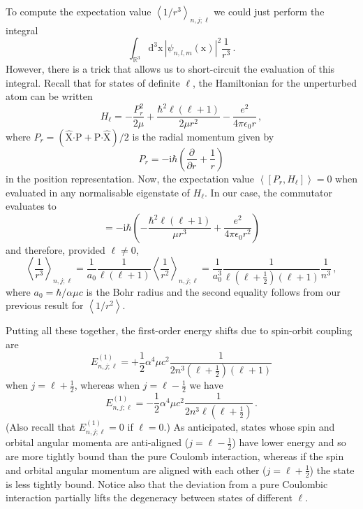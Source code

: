 \documentclass{article}
\theoremstyle{plain}\theoremheaderfont{\normalfont\itshape}\theorembodyfont{\rmfamily}\theoremseparator{.}\newtheorem*{rem}{Remark}\newtheorem*{ex}{Example}\newtheorem*{proof}{Proof}\newtheorem*{altp}{Alternative proof}
\theoremstyle{plain}\theoremheaderfont{\normalfont\bfseries}\theorembodyfont{\rmfamily}\theoremseparator{.}\newtheorem{thm}{Theorem}[section]\newtheorem{lem}[thm]{Lemma}\newtheorem{prop}[thm]{Proposition}\newtheorem*{cor}{Corollary}\newtheorem{defn}[thm]{Definition}\newtheorem{clm}[thm]{Claim}\newtheorem{clminproof}{Claim}
\theoremstyle{break}\theoremheaderfont{\normalfont\itshape}\theorembodyfont{\rmfamily}\theoremseparator{.\medskip}\newtheorem*{proofskip}{Proof}\newtheorem*{exs}{Examples}\newtheorem*{rems}{Remarks}
\theoremstyle{break}\theoremheaderfont{\normalfont\bfseries}\theorembodyfont{\rmfamily}\theoremseparator{.\medskip}\newtheorem{lemskip}[thm]{Lemma}\newtheorem{defnskip}[thm]{Definition}\newtheorem{propskip}[thm]{Proposition}\newtheorem{thmskip}[thm]{Theorem}
\numberwithin{equation}{section}
\newcommand{\ii}{\mathrm{i}}
\newcommand{\dd}[2][]{\mathrm{d}^{#1} #2\,}
\newcommand{\pdv}[3][]{\frac{\partial^{#1} #2}{{\partial #3}^{#1}}}
\newcommand{\eval}[1]{\left\langle #1 \right\rangle}
\newcommand{\vb}[1]{\bm{\mathrm{#1}}}
\newcommand{\vu}[1]{\hat{\bm{\mathrm{#1}}}}
\newcommand{\vdot}{\bm{\cdot}}
\newcommand{\abs}[1]{\left| #1 \right|}
\newcommand{\RR}{\mathbb{R}}
\begin{document}
    To compute the expectation value \(\eval{1/r^3}_{n,j;\ell}\) we could just perform the integral
    \begin{equation}
        \int_{\RR^3}\dd[3]{\vb{x}}\abs{\psi_{n,l,m}(\vb{x})}^2\frac{1}{r^3}\,.
    \end{equation}
    However, there is a trick that allows us to short-circuit the evaluation of this integral. Recall that for states of definite \(\ell\), the Hamiltonian for the unperturbed atom can be written
    \begin{equation}
        H_{\ell}=-\frac{P_r^2}{2\mu}+\frac{\hbar^2\ell(\ell+1)}{2\mu r^2}-\frac{e^2}{4\pi\epsilon_0 r}\,,
    \end{equation}
    where \(P_r=(\vu{X}\vdot\vb{P}+\vb{P}\vdot\vu{X})/2\) is the radial momentum given by
    \begin{equation}
        P_r=-\ii\hbar\left(\pdv{}{r}+\frac{1}{r}\right)
    \end{equation}
    in the position representation. Now, the expectation value \(\eval{[P_r,H_\ell]}=0\) when evaluated in any normalisable eigenstate of \(H_\ell\). In our case, the commutator evaluates to
    \begin{equation}
        [P_r,H_\ell]=-\ii\hbar\left(-\frac{\hbar^2\ell(\ell+1)}{\mu r^3}+\frac{e^2}{4\pi\epsilon_0 r^2}\right)
    \end{equation}
    and therefore, provided \(\ell\ne 0\),
    \begin{equation}
        \eval{\frac{1}{r^3}}_{n,j;\ell}=\frac{1}{a_0}\frac{1}{\ell(\ell+1)}\eval{\frac{1}{r^2}}_{n,j;\ell}=\frac{1}{a_0^3}\frac{1}{\ell(\ell+\frac{1}{2})(\ell+1)}\frac{1}{n^3}\,,
    \end{equation}
    where \(a_0=\hbar/\alpha\mu c\) is the Bohr radius and the second equality follows from our previous result for \(\eval{1/r^2}\).

    Putting all these together, the first-order energy shifts due to spin-orbit coupling are
    \begin{equation}\label{spin_orbit_aligned}
        E_{n,j;\ell}^{(1)}=+\frac{1}{2}\alpha^4\mu c^2\frac{1}{2n^3(\ell+\frac{1}{2})(\ell+1)}
    \end{equation}
    when \(j=\ell+\frac{1}{2}\), whereas when \(j=\ell-\frac{1}{2}\) we have
    \begin{equation}\label{spin_orbit_antialigned}
        E_{n,j;\ell}^{(1)}=-\frac{1}{2}\alpha^4\mu c^2\frac{1}{2n^3\ell(\ell+\frac{1}{2})}\,.
    \end{equation}
    (Also recall that \(E_{n,j;\ell}^{(1)}=0\) if \(\ell=0\).) As anticipated, states whose spin and orbital angular momenta are anti-aligned (\(j=\ell-\frac{1}{2}\)) have lower energy and so are more tightly bound than the pure Coulomb interaction, whereas if the spin and orbital angular momentum are aligned with each other (\(j=\ell+\frac{1}{2}\)) the state is less tightly bound. Notice also that the deviation from a pure Coulombic interaction partially lifts the degeneracy between states of different \(\ell\).
\end{document}
